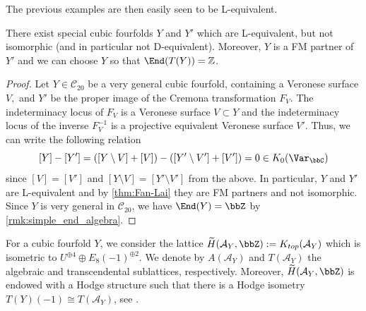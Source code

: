 \documentclass{amsart}
\begin{document}
The previous examples are then easily seen to be L-equivalent. 
\begin{proposition}\label{prop:counterexamples}
 There exist special cubic fourfolds \(Y\) and \(Y'\) which are L-equivalent, but not isomorphic (and in particular not D-equivalent). Moreover, \(Y\) is a FM partner of \(Y'\) and we can choose \(Y\) so that \(\End(T(Y))=\mathbb{Z}\).   
\end{proposition}
\begin{proof}
   Let \(Y\in \mathcal{C}_{20}\) be a very general cubic fourfold, containing a Veronese surface \(V,\) and \(Y'\) be the proper image of the Cremona transformation \(F_V\). The indeterminacy locus of \(F_V\) is a Veronese surface \(V\subset Y\) and the indeterminacy locus of the inverse \(F_V^{-1}\) is a projective equivalent Veronese surface \(V'\). Thus, we can write the following relation 
    \[[Y]-[Y']=([Y\setminus V]+[V])-([Y'\setminus V']+[V'])=0\in K_0(\Var_\bbC)\]
    since \([V]=[V']\) and \([Y\setminus V] = [Y'\setminus V']\) from the above. In particular, \(Y\) and \(Y'\) are L-equivalent and by \autoref{thm:Fan-Lai} they are FM partners and not isomorphic. Since \(Y\) is very general in \(\mathcal{C}_{20}\), we have \(\End(Y)=\bbZ\) by \autoref{rmk:simple_end_algebra}.
\end{proof}

For a cubic fourfold \(Y\), we consider the lattice \(\widetilde{H}(\mathcal{A}_Y,\bbZ):=K_{top}(\mathcal{A}_Y)\) which is isometric to \(U^{\oplus 4}\oplus E_8(-1)^{\oplus 2}\). 
We denote by \(A(\mathcal{A}_Y)\) and \(T(\mathcal{A}_Y)\) the algebraic and transcendental sublattices, respectively. Moreover, \(\widetilde{H}(\mathcal{A}_Y,\bbZ)\) is endowed with a Hodge structure such that there is a Hodge isometry \(T(Y)(-1)\cong T(\mathcal{A}_Y)\), see \cite{Addington_rationality}. 
\end{document}
